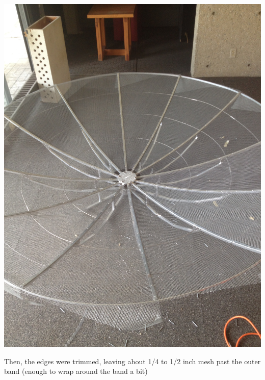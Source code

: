 \documentclass[11pt]{article} %
\begin{document}
\begin{center}
\includegraphics[scale=0.12]{dish/16.jpeg}
\end{center}

Then, the edges were trimmed, leaving about 1/4 to 1/2 inch mesh past the outer band (enough to wrap around the band a bit)
\end{document}
